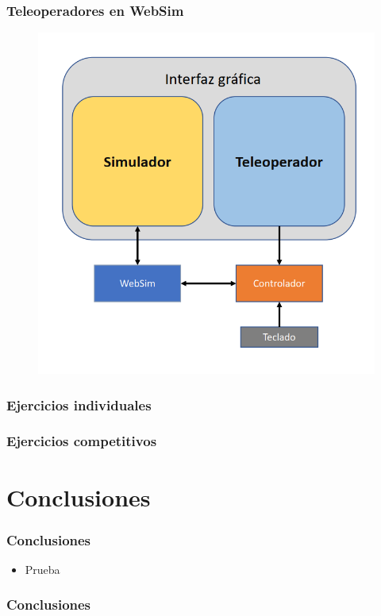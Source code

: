 \documentclass[xcolor={table}]{beamer}
\begin{document}
		\begin{frame}
			\frametitle{Teleoperadores en WebSim}
			\begin{figure}
			    \centering			    \includegraphics[scale=0.45]{arquitecturaTeleoperador.png}
			    \label{fig:teleop}
			\end{figure}
			
		\end{frame}

		\begin{frame}
			\frametitle{Ejercicios individuales}
		\end{frame}
		
		\begin{frame}
			\frametitle{Ejercicios competitivos}
		\end{frame}

	\section{Conclusiones}
		\begin{frame}
			\frametitle{Conclusiones}
			\begin{itemize}
				\item Prueba
			\end{itemize}
		\end{frame}
	
	\appendix

	\backupbegin
	  \begin{frame}
	    \frametitle{Conclusiones}
	  \end{frame}
	\backupend
\end{document}

